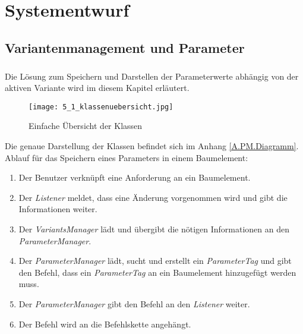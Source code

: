 \chapter{Systementwurf}\label{chp:systementwurf}

\section{Variantenmanagement und Parameter}
\paragraph{}

Die Lösung zum Speichern und Darstellen der Parameterwerte abhängig von der aktiven Variante wird im diesem Kapitel erläutert.\\

\begin{figure}[h!]
  \begin{center}
    \texttt{[image: 5\_1\_klassenuebersicht.jpg]}
  		  \caption{Einfache Übersicht der Klassen}
     \label{ttn.verbindung.klassen.loesung}
  \end{center}
\end{figure}


Die genaue Darstellung der Klassen befindet sich im Anhang  \ref{A.PM.Diagramm}. Ablauf für das Speichern eines Parameters in einem Baumelement:
\begin{enumerate}
\item Der Benutzer verknüpft eine Anforderung an ein Baumelement.
\item Der \textit{Listener} meldet, dass eine Änderung vorgenommen wird und gibt die Informationen weiter.
\item Der \textit{VariantsManager} lädt und übergibt die nötigen Informationen an den \textit{ParameterManager}.
\item Der \textit{ParameterManager} lädt, sucht und erstellt ein \textit{ParameterTag}  und gibt den Befehl, dass ein \textit{ParameterTag} an ein Baumelement hinzugefügt werden muss.
\item Der \textit{ParameterManager} gibt den Befehl an den \textit{Listener} weiter.
\item Der Befehl wird an die Befehlskette angehängt.
\end{enumerate}

